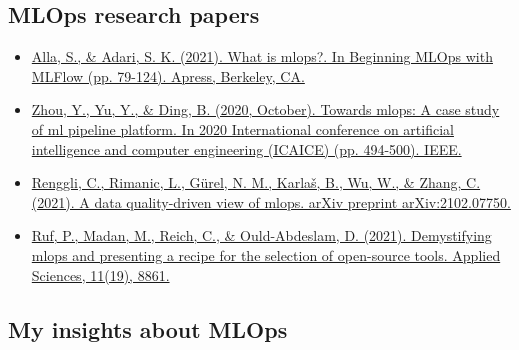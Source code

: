 \documentclass{article}
\begin{document}
\subsection{MLOps research papers}
\begin{itemize}
\item \href{https://arxiv.org/pdf/2103.08942.pdf[Zugriffam09.09.2021}{Alla, S., \& Adari, S. K. (2021). What is mlops?. In Beginning MLOps with MLFlow (pp. 79-124). Apress, Berkeley, CA.} \cite{alla2021mlops}
\item \href{https://www.researchgate.net/profile/Yue-Yu-126/publication/349802712_Towards_MLOps_A_Case_Study_of_ML_Pipeline_Platform/links/61dd00575c0a257a6fdd62f3/Towards-MLOps-A-Case-Study-of-ML-Pipeline-Platform.pdf}{Zhou, Y., Yu, Y., \& Ding, B. (2020, October). Towards mlops: A case study of ml pipeline platform. In 2020 International conference on artificial intelligence and computer engineering (ICAICE) (pp. 494-500). IEEE.} \cite{zhou2020towards}
\item \href{https://arxiv.org/pdf/2102.07750.pdf}{Renggli, C., Rimanic, L., Gürel, N. M., Karlaš, B., Wu, W., \& Zhang, C. (2021). A data quality-driven view of mlops. arXiv preprint arXiv:2102.07750.} \cite{renggli2021data}
\item \href{https://www.mdpi.com/2076-3417/11/19/8861/pd}{Ruf, P., Madan, M., Reich, C., \& Ould-Abdeslam, D. (2021). Demystifying mlops and presenting a recipe for the selection of open-source tools. Applied Sciences, 11(19), 8861.} \cite{ruf2021demystifying}
\end{itemize}

\subsection{My insights about MLOps}
\end{document}
